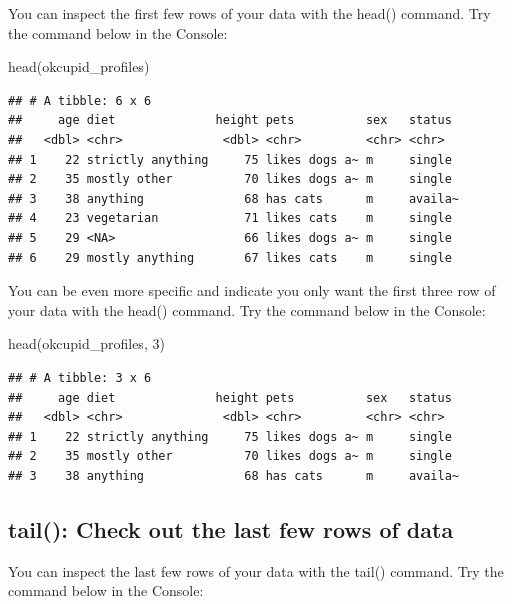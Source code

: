 \documentclass[
]{krantz}
\makeatletter
\newenvironment{Shaded}{\begin{snugshade}}{\end{snugshade}}
\newcommand{\DecValTok}[1]{\textcolor[rgb]{0.06,0.06,0.06}{#1}}
\newcommand{\FunctionTok}[1]{\textcolor[rgb]{0,0,0}{#1}}
\newcommand{\NormalTok}[1]{#1}
\newenvironment{kframe}{%
\medskip{}
\setlength{\fboxsep}{.8em}
 \def\at@end@of@kframe{}%
 \ifinner\ifhmode%
  \def\at@end@of@kframe{\end{minipage}}%
  \begin{minipage}{\columnwidth}%
 \fi\fi%
 \def\FrameCommand##1{\hskip\@totalleftmargin \hskip-\fboxsep
 \colorbox{shadecolor}{##1}\hskip-\fboxsep
     \hskip-\linewidth \hskip-\@totalleftmargin \hskip\columnwidth}%
 \MakeFramed {\advance\hsize-\width
   \@totalleftmargin\z@ \linewidth\hsize
   \@setminipage}}%
 {\par\unskip\endMakeFramed%
 \at@end@of@kframe}
\renewenvironment{Shaded}{\begin{kframe}}{\end{kframe}}
\makeatother
\begin{document}
You can inspect the first few rows of your data with the head() command. Try the command below in the Console:

\begin{Shaded}
\begin{Highlighting}[]
\FunctionTok{head}\NormalTok{(okcupid\_profiles)}
\end{Highlighting}
\end{Shaded}

\begin{verbatim}
## # A tibble: 6 x 6
##     age diet              height pets          sex   status 
##   <dbl> <chr>              <dbl> <chr>         <chr> <chr>  
## 1    22 strictly anything     75 likes dogs a~ m     single 
## 2    35 mostly other          70 likes dogs a~ m     single 
## 3    38 anything              68 has cats      m     availa~
## 4    23 vegetarian            71 likes cats    m     single 
## 5    29 <NA>                  66 likes dogs a~ m     single 
## 6    29 mostly anything       67 likes cats    m     single
\end{verbatim}

You can be even more specific and indicate you only want the first three row of your data with the head() command. Try the command below in the Console:

\begin{Shaded}
\begin{Highlighting}[]
\FunctionTok{head}\NormalTok{(okcupid\_profiles, }\DecValTok{3}\NormalTok{)}
\end{Highlighting}
\end{Shaded}

\begin{verbatim}
## # A tibble: 3 x 6
##     age diet              height pets          sex   status 
##   <dbl> <chr>              <dbl> <chr>         <chr> <chr>  
## 1    22 strictly anything     75 likes dogs a~ m     single 
## 2    35 mostly other          70 likes dogs a~ m     single 
## 3    38 anything              68 has cats      m     availa~
\end{verbatim}

\hypertarget{tail-check-out-the-last-few-rows-of-data}{%
\subsection{tail(): Check out the last few rows of data}\label{tail-check-out-the-last-few-rows-of-data}}

You can inspect the last few rows of your data with the tail() command. Try the command below in the Console:
\end{document}
